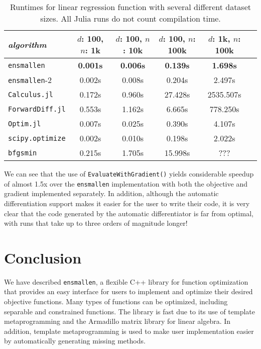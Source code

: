 \documentclass{article}
\begin{document}
\begin{table}
\begin{center}
\begin{tabular}{lccccc}
\toprule
{\em algorithm} & $d$: 100, $n$: 1k & $d$: 100, $n$: 10k & $d$: 100, $n$:
100k & $d$: 1k, $n$: 100k \\
\midrule
{\tt ensmallen} & {\bf 0.001s} & {\bf 0.006s} & {\bf 0.139s} & {\bf 1.698s} \\
{\tt ensmallen}-2 & 0.002s & 0.008s & 0.204s & 2.497s \\
{\tt Calculus.jl} & 0.172s & 0.960s & 27.428s & 2535.507s \\
{\tt ForwardDiff.jl} & 0.553s & 1.162s & 6.665s & 778.250s \\
{\tt Optim.jl} & 0.007s & 0.025s & 0.390s & 4.107s \\
{\tt scipy.optimize} & 0.002s & 0.010s & 0.198s & 2.022s \\
{\tt bfgsmin} & 0.215s & 1.705s & 15.998s & ??? \\
\bottomrule
\end{tabular}
\end{center}
\caption{Runtimes for linear regression function with several different dataset
sizes.  All Julia runs do not count compilation time.}
\label{tab:lbfgs}
\end{table}

We can see that the use of {\tt EvaluateWithGradient()} yields considerable
speedup of almost 1.5x over the {\tt ensmallen} implementation with both the
objective and gradient implemented separately.  In addition, although the
automatic differentiation support makes it easier for the user to write their
code, it is very clear that the code generated by the automatic differentiator
is far from optimal, with runs that take up to three orders of magnitude longer!

\vspace*{-0.3em}
\section{Conclusion}
\vspace*{-0.5em}

We have described {\tt ensmallen}, a flexible C++ library for function
optimization that provides an easy interface for users to implement and optimize
their desired objective functions.  Many types of functions can be optimized,
including separable and constrained functions.  The library is fast due to its
use of template metaprogramming and the Armadillo matrix library for linear
algebra.  In addition, template metaprogramming is used to make user
implementation easier by automatically generating missing methods.
\end{document}
